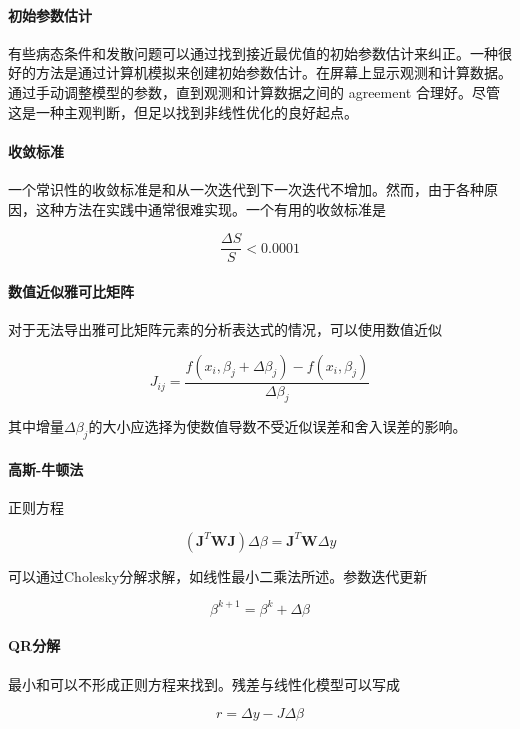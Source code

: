 \documentclass{ctexart}
\begin{document}
\paragraph{初始参数估计}

有些病态条件和发散问题可以通过找到接近最优值的初始参数估计来纠正\cite{fletcher1971ukaea}。一种很好的方法是通过计算机模拟来创建初始参数估计。在屏幕上显示观测和计算数据。通过手动调整模型的参数，直到观测和计算数据之间的 agreement 合理好。尽管这是一种主观判断，但足以找到非线性优化的良好起点。


\paragraph{收敛标准}

一个常识性的收敛标准是和从一次迭代到下一次迭代不增加。然而，由于各种原因，这种方法在实践中通常很难实现。一个有用的收敛标准是

\[ \frac{\Delta S}{S} < 0.0001 \]

\paragraph{数值近似雅可比矩阵}

对于无法导出雅可比矩阵元素的分析表达式的情况，可以使用数值近似\cite{britzger2022linear}

\[ J_{ij} = \frac{f(x_i, \beta_j + \Delta \beta_j) - f(x_i, \beta_j)}{\Delta \beta_j} \]

其中增量$\Delta \beta_j$的大小应选择为使数值导数不受近似误差和舍入误差的影响。


\paragraph{高斯-牛顿法}

正则方程

\[ (\mathbf{J}^T \mathbf{W} \mathbf{J}) \Delta \beta = \mathbf{J}^T \mathbf{W} \Delta y \]

可以通过Cholesky分解求解，如线性最小二乘法所述。参数迭代更新

\[ \beta^{k+1} = \beta^k + \Delta \beta \]

\paragraph{QR分解}

最小和可以不形成正则方程来找到\cite{lawson1974solving}。残差与线性化模型可以写成

\[ r = \Delta y - J \Delta \beta \]
\end{document}

